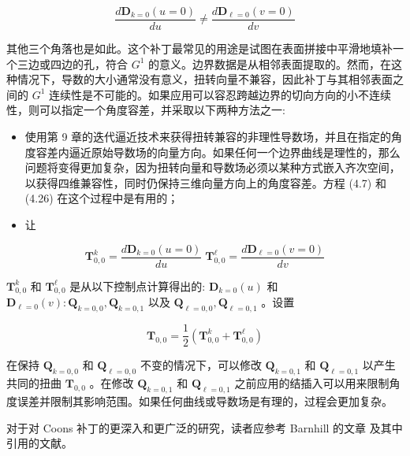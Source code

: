 \documentclass[../main.tex]{subfiles}
\begin{document}
\[
\frac{d{\mathbf{D}}_{k = 0}\left( {u = 0}\right) }{du} \neq  \frac{d{\mathbf{D}}_{\ell  = 0}\left( {v = 0}\right) }{dv}
\]

其他三个角落也是如此。这个补丁最常见的用途是试图在表面拼接中平滑地填补一个三边或四边的孔，符合 \({G}^{1}\) 的意义。边界数据是从相邻表面提取的。然而，在这种情况下，导数的大小通常没有意义，扭转向量不兼容，因此补丁与其相邻表面之间的 \({G}^{1}\) 连续性是不可能的。如果应用可以容忍跨越边界的切向方向的小不连续性，则可以指定一个角度容差，并采取以下两种方法之一:

\begin{itemize}
\item 使用第 9 章的迭代逼近技术来获得扭转兼容的非理性导数场，并且在指定的角度容差内逼近原始导数场的向量方向。如果任何一个边界曲线是理性的，那么问题将变得更加复杂，因为扭转向量和导数场必须以某种方式嵌入齐次空间，以获得四维兼容性，同时仍保持三维向量方向上的角度容差。方程 (4.7) 和 (4.26) 在这个过程中是有用的；
\end{itemize}

\begin{itemize}
\item 让
\end{itemize}

\[
{\mathbf{T}}_{0,0}^{k} = \frac{d{\mathbf{D}}_{k = 0}\left( {u = 0}\right) }{du}\;{\mathbf{T}}_{0,0}^{\ell } = \frac{d{\mathbf{D}}_{\ell  = 0}\left( {v = 0}\right) }{dv}
\]

\({\mathbf{T}}_{0,0}^{k}\) 和 \({\mathbf{T}}_{0,0}^{\ell }\) 是从以下控制点计算得出的: \({\mathbf{D}}_{k = 0}\left( u\right)\) 和 \({\mathbf{D}}_{\ell  = 0}\left( v\right)  : {\mathbf{Q}}_{k = 0,0},{\mathbf{Q}}_{k = 0,1}\) 以及 \({\mathbf{Q}}_{\ell  = 0,0},{\mathbf{Q}}_{\ell  = 0,1}\) 。设置

\[
{\mathbf{T}}_{0,0} = \frac{1}{2}\left( {{\mathbf{T}}_{0,0}^{k} + {\mathbf{T}}_{0,0}^{\ell }}\right)
\]

在保持 \({\mathbf{Q}}_{k = 0,0}\) 和 \({\mathbf{Q}}_{\ell  = 0,0}\) 不变的情况下，可以修改 \({\mathbf{Q}}_{k = 0,1}\) 和 \({\mathbf{Q}}_{\ell  = 0,1}\) 以产生共同的扭曲 \({\mathbf{T}}_{0,0}\) 。在修改 \({\mathbf{Q}}_{k = 0,1}\) 和 \({\mathbf{Q}}_{\ell  = 0,1}\) 之前应用的结插入可以用来限制角度误差并限制其影响范围。如果任何曲线或导数场是有理的，过程会更加复杂。

对于对 Coons 补丁的更深入和更广泛的研究，读者应参考 Barnhill 的文章 \cite{Barn93} 及其中引用的文献。
\end{document}

